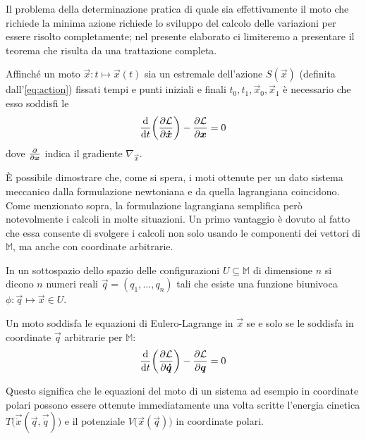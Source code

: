Il problema della determinazione pratica di quale sia effettivamente il moto che richiede la minima azione richiede lo sviluppo del calcolo delle variazioni per essere risolto completamente; nel presente elaborato ci limiteremo a presentare il teorema che risulta da una trattazione completa.
\begin{theorem}
  Affinché un moto $\vec{x}: t\mapsto \vec{x}(t)$ sia un estremale dell'azione $S(\vec{x})$ (definita dall'\autoref{eq:action}) fissati tempi e punti iniziali e finali $t_0, t_1, \vec{x}_0, \vec{x}_1$ è necessario che esso soddisfi le  \begin{equation}
    \dv{t}(\pdv{\mathcal{L}}{\boldsymbol{\dot{x}}}) - \pdv{\mathcal{L}}{\boldsymbol{x}} = 0
  \end{equation} 
  dove $\pdv{\boldsymbol{x}}$ indica il gradiente $\nabla_{\vec{x}}$.
\end{theorem}

È possibile dimostrare che, come si spera, i moti ottenute per un dato sistema meccanico dalla formulazione newtoniana e da quella lagrangiana coincidono. Come menzionato sopra, la formulazione lagrangiana semplifica però notevolmente i calcoli in molte situazioni. Un primo vantaggio è dovuto al fatto che essa consente di svolgere i calcoli non solo usando le componenti dei vettori di $\mathbb{M}$, ma anche con coordinate arbitrarie.

\begin{definition}
  In un sottospazio dello spazio delle configurazioni $U \subseteq \mathbb{M}$ di dimensione $n$ si dicono  $n$ numeri reali $\vec{q}=(q_1, \ldots, q_n)$ tali che esiste una funzione biunivoca $\phi: \vec{q} \mapsto \vec{x}\in U$.
\end{definition}
\begin{theorem}
  Un moto soddisfa le equazioni di Eulero-Lagrange in $\vec{x}$ se e solo se le soddisfa in coordinate $\vec{q}$ arbitrarie per $\mathbb{M}$: \begin{equation}
    \dv{t}(\pdv{\mathcal{L}}{\boldsymbol{\dot{q}}}) - \pdv{\mathcal{L}}{\boldsymbol{q}} = 0
  \end{equation} 
\end{theorem}

Questo significa che le equazioni del moto di un sistema ad esempio in coordinate polari possono essere ottenute immediatamente una volta scritte l'energia cinetica $T\big(\vec{\dot{x}}(\vec{q},\vec{\dot{q}})\big)$ e il potenziale $V\big(\vec{x}(\vec{q})\big)$ in coordinate polari.

